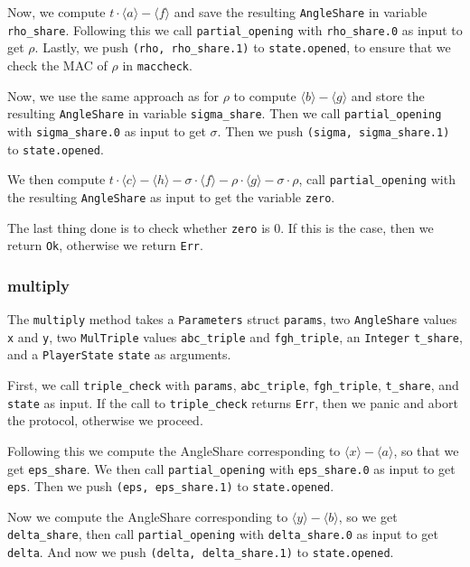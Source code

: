 \documentclass[../main.tex]{subfiles}
\begin{document}
Now, we compute $t \cdot \langle a \rangle - \langle f \rangle$ and save the resulting \lstinline{AngleShare} in variable \lstinline{rho_share}. Following this we call \lstinline{partial_opening} with \lstinline{rho_share.0} as input to get $\rho$. Lastly, we push \lstinline{(rho, rho_share.1)} to \lstinline{state.opened}, to ensure that we check the MAC of $\rho$ in \lstinline{maccheck}.

Now, we use the same approach as for $\rho$ to compute $\langle b \rangle - \langle g \rangle$ and store the resulting \lstinline{AngleShare} in variable \lstinline{sigma_share}. Then we call \lstinline{partial_opening} with \lstinline{sigma_share.0} as input to get $\sigma$. Then we push \lstinline{(sigma, sigma_share.1)} to \lstinline{state.opened}.

We then compute $t \cdot \langle c \rangle - \langle h \rangle - \sigma \cdot \langle f \rangle - \rho \cdot \langle g \rangle - \sigma \cdot \rho$, call \lstinline{partial_opening} with the resulting \lstinline{AngleShare} as input to get the variable \lstinline{zero}.

The last thing done is to check whether \lstinline{zero} is $0$. If this is the case, then we return \lstinline{Ok}, otherwise we return \lstinline{Err}.

\subsubsection{multiply}
The \lstinline{multiply} method takes a \lstinline{Parameters} struct \lstinline{params}, two \lstinline{AngleShare} values \lstinline{x} and \lstinline{y}, two \lstinline{MulTriple} values \lstinline{abc_triple} and \lstinline{fgh_triple}, an \lstinline{Integer} \lstinline{t_share}, and a \lstinline{PlayerState} \lstinline{state} as arguments.

First, we call \lstinline{triple_check} with \lstinline{params}, \lstinline{abc_triple}, \lstinline{fgh_triple}, \lstinline{t_share}, and \lstinline{state} as input. If the call to \lstinline{triple_check} returns \lstinline{Err}, then we panic and abort the protocol, otherwise we proceed.

Following this we compute the AngleShare corresponding to $\langle x \rangle - \langle a \rangle$, so that we get \lstinline{eps_share}. We then call \lstinline{partial_opening} with \lstinline{eps_share.0} as input to get \lstinline{eps}. Then we push \lstinline{(eps, eps_share.1)} to \lstinline{state.opened}.

Now we compute the AngleShare corresponding to $\langle y \rangle - \langle b \rangle$, so we get \lstinline{delta_share}, then call \lstinline{partial_opening} with \lstinline{delta_share.0} as input to get \lstinline{delta}. And now we push \lstinline{(delta, delta_share.1)} to \lstinline{state.opened}.
\end{document}
